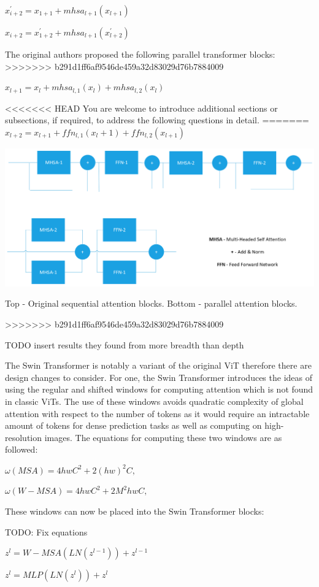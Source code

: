 \documentclass[10pt,twocolumn,letterpaper]{article}
\begin{document}
$x^{'}_{i+2} = x_{1+1} + mhsa_{l+1}(x_{l+1})$

$x_{i+2} = x^{'}_{1+2} + mhsa_{l+1}(x^{'}_{l+2})$

The original authors proposed the following parallel transformer blocks:
>>>>>>> b291d1ff6af9546de459a32d83029d76b7884009

$x_{l+1} = x_{l} + mhsa_{l,1}(x_l) + mhsa_{l,2}(x_l)$

<<<<<<< HEAD
You are welcome to introduce additional sections or subsections, if required, to address the following questions in detail. 
=======
$x_{l+2} = x_{l+1} + ffn_{l,1}(x_l+1) + ffn_{l,2}(x_{l+1})$

\includegraphics[width=0.8\linewidth]{docs/latex/images/MHSA-Original.png}
\caption{Top - Original sequential attention blocks. Bottom - parallel attention blocks.}
>>>>>>> b291d1ff6af9546de459a32d83029d76b7884009

TODO insert results they found from more breadth than depth

The Swin Transformer is notably a variant of the original ViT therefore there are design changes to consider. For one, the Swin Transformer introduces the ideas of using the regular and shifted windows for computing attention which is not found in classic ViTs. The use of these windows avoids quadratic complexity of global attention with respect to the number of tokens as it would require an intractable amount of tokens for dense prediction tasks as well as computing on high-resolution images. The equations for computing these two windows are as followed:

$\omega(MSA) = 4hwC^2 + 2(hw)^{2}C,$

$\omega(W-MSA) = 4hwC^2 + 2M^{2}hwC,$

These windows can now be placed into the Swin Transformer blocks:

TODO: Fix equations

$z^{l} = W-MSA (LN(z^{l-1})) + z^{l-1}$

$z^{l} = MLP (LN(z^{l})) + z^{l}$
\end{document}
